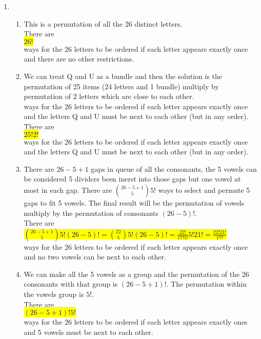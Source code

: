 \documentclass{article}
\begin{document}
\begin{enumerate}
\begin{enumerate}
	\end{enumerate}
	
	\item
	\begin{enumerate}
		
		\item 
		\mysolu
		This is a permutation of all the 26 distinct letters.\\
		\myansw
		There are\\
		\colorbox{yellow}{
			${26!}$
		}\\
		ways for the 26 letters to be ordered if each letter appears exactly once and there are no other restrictions.\\
		
		\item
		\mysolu
		We can treat Q and U as a bundle and then the solution is the permutation of 25 items (24 letters and 1 bundle) multiply by permutation of 2 letters which are close to each other.\\
		ways for the 26 letters to be ordered if each letter appears exactly once and the letters Q and U must be next to each other (but in any order).\\
				\myansw
		There are\\
		\colorbox{yellow}{
			${25!2!}$
		}\\
		ways for the 26 letters to be ordered if each letter appears exactly once and the letters Q and U must be next to each other (but in any order).\\
		
		
		\item
		\mysolu
		There are ${26-5+1}$ gaps in queue of all the consonants, the 5 vowels can be considered 5 dividers been inerst into those gaps but one vowel at most in each gap. There are ${{26-5+1 \choose 5}5!}$ ways to select and permute 5 gaps to fit 5 vowels. The final result will be the permutation of vowels multiply by the permutation of consonants ${(26-5)!}$. \\
		\myansw
		There are\\
		\colorbox{yellow}{
			${{26-5+1 \choose 5}5!(26-5)! ={22 \choose 5}5!(26-5)! = \frac{22!}{17!5!}5!21! = \frac{22!21!}{17!}}$
		}\\
		ways for the 26 letters to be ordered if each letter appears exactly once and no two vowels can be next to each other.\\
		
		\item
		\mysolu
		We can make all the 5 vowels as a group and the permutation of the 26 consonants with that group is ${{(26-5+1)!}}$. The permutation within the vowels group is ${5!}$.\\
		\myansw
		There are\\
		\colorbox{yellow}{
			${(26-5+1)!5!}$
		}\\
		ways for the 26 letters to be ordered if each letter appears exactly ones and 5 vowels must be next to each other.\\ 
		

\end{enumerate}
\end{enumerate}
\end{document}
